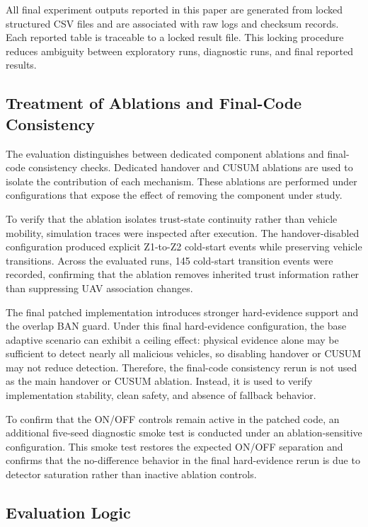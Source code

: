 \documentclass[journal]{IEEEtran}
\begin{document}
All final experiment outputs reported in this paper are generated from locked structured CSV files and are associated with raw logs and checksum records. Each reported table is traceable to a locked result file. This locking procedure reduces ambiguity between exploratory runs, diagnostic runs, and final reported results.

\subsection{Treatment of Ablations and Final-Code Consistency}
\label{subsec:ablation_treatment}

The evaluation distinguishes between dedicated component ablations and final-code consistency checks. Dedicated handover and CUSUM ablations are used to isolate the contribution of each mechanism. These ablations are performed under configurations that expose the effect of removing the component under study.

To verify that the ablation isolates trust-state continuity rather than
vehicle mobility, simulation traces were inspected after execution. The
handover-disabled configuration produced explicit Z1-to-Z2 cold-start
events while preserving vehicle transitions. Across the evaluated runs,
145 cold-start transition events were recorded, confirming that the
ablation removes inherited trust information rather than suppressing UAV
association changes.

The final patched implementation introduces stronger hard-evidence support and the overlap BAN guard. Under this final hard-evidence configuration, the base adaptive scenario can exhibit a ceiling effect: physical evidence alone may be sufficient to detect nearly all malicious vehicles, so disabling handover or CUSUM may not reduce detection. Therefore, the final-code consistency rerun is not used as the main handover or CUSUM ablation. Instead, it is used to verify implementation stability, clean safety, and absence of fallback behavior.

To confirm that the ON/OFF controls remain active in the patched code, an additional five-seed diagnostic smoke test is conducted under an ablation-sensitive configuration. This smoke test restores the expected ON/OFF separation and confirms that the no-difference behavior in the final hard-evidence rerun is due to detector saturation rather than inactive ablation controls.

\subsection{Evaluation Logic}
\label{subsec:evaluation_logic}
\end{document}
